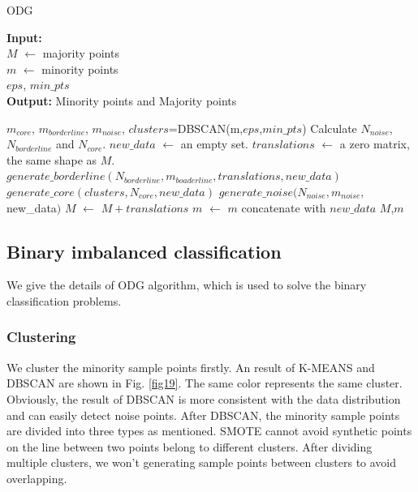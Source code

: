 \documentclass[runningheads]{llncs}
\begin{document}
\begin{algorithm}[tbp]
  \caption{ODG} %
  \label{alg1}
  \hspace*{0.02in} {\bf Input:}
   \\$M$ $\leftarrow$ majority points  \\
   $m$ $\leftarrow$ minority points  \\
   $eps$, $min\_pts$\\
  \hspace*{0.02in} {\bf Output:} %
  Minority points and Majority points
  \begin{algorithmic}[1]
  \State $m_{core}$, $m_{borderline}$, $m_{noise}$, $clusters$=DBSCAN(m,$eps$,$min\_pts$) %
  \State Calculate $N_{noise}$, $N_{borderline}$ and $N_{core}$.
  \State $new\_data$ $\leftarrow$ an empty set.
  \State $translations$ $\leftarrow$ a zero matrix, the same shape as $M$.
  \State $generate\_borderline(N_{borderline},m_{boaderline},translations, new\_data)$
  \State $generate\_core(clusters,N_{core},new\_data)$
  \State $generate\_noise(N_{noise},m_{noise},$new\_data$)$
  \State $M$ $\leftarrow$ $M+translations$
  \State $m$ $\leftarrow$ $m$ concatenate with $new\_data$
  \State \Return $M$,$m$
  \end{algorithmic}
  \end{algorithm}
\subsection{Binary imbalanced classification}
We give the details of ODG algorithm, which is used to solve the binary classification problems.
\subsubsection{Clustering}
We cluster the minority sample points firstly.
An result of K-MEANS and DBSCAN are shown in Fig. \ref{fig19}.
The same color represents the same cluster.
Obviously, the result of DBSCAN is more 
consistent with the data distribution and can easily detect noise points.
After DBSCAN, 
the minority sample points are divided into three types as mentioned.
SMOTE cannot avoid synthetic points on the line between 
two points belong to different clusters.
After dividing multiple clusters, 
we won't generating sample points between clusters to avoid overlapping.
\end{document}
